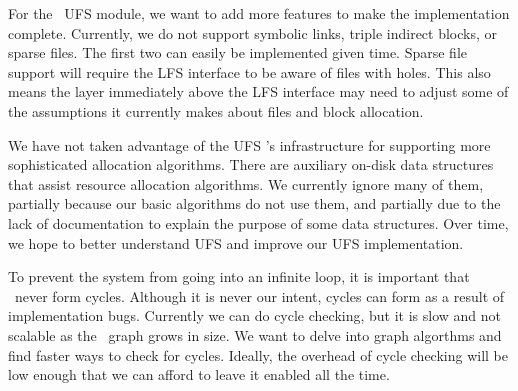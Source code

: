 For the \Kudos\ UFS module, we want to add more features to make the
implementation complete. Currently, we do not support symbolic links, triple
indirect blocks, or sparse files. The first two can easily be implemented
given time. Sparse file support will require the LFS interface to be aware of
files with holes. This also means the layer immediately above the LFS interface
may need to adjust some of the assumptions it currently makes about files and
block allocation.

We have not taken advantage of the UFS \module's infrastructure for supporting
more sophisticated allocation algorithms. There are auxiliary on-disk data
structures that assist resource allocation algorithms. We currently ignore many
of them, partially because our basic algorithms do not use them, and partially
due to the lack of documentation to explain the purpose of some data
structures. Over time, we hope to better understand UFS and improve our UFS
implementation.

To prevent the system from going into an infinite loop, it is important that
\chdescs\ never form cycles. Although it is never our intent, cycles can form
as a result of implementation bugs. Currently we can do cycle checking, but it
is slow and not scalable as the \chdesc\ graph grows in size. We want to delve
into graph algorthms and find faster ways to check for cycles. Ideally, the
overhead of cycle checking will be low enough that we can afford to leave it
enabled all the time.
